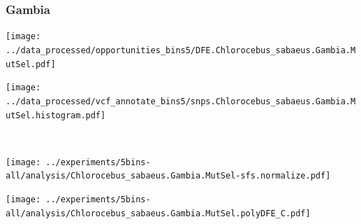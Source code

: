 \subsubsection{Gambia}

\begin{minipage}{0.49\linewidth}
    \texttt{[image: ../data\_processed/opportunities\_bins5/DFE.Chlorocebus\_sabaeus.Gambia.MutSel.pdf]}
\end{minipage}
\begin{minipage}{0.49\linewidth}
    \texttt{[image: ../data\_processed/vcf\_annotate\_bins5/snps.Chlorocebus\_sabaeus.Gambia.MutSel.histogram.pdf]}
\end{minipage}
\\
\begin{minipage}{0.49\linewidth}
    \texttt{[image: ../experiments/5bins-all/analysis/Chlorocebus\_sabaeus.Gambia.MutSel-sfs.normalize.pdf]}
\end{minipage}
\begin{minipage}{0.4\linewidth}
    \texttt{[image: ../experiments/5bins-all/analysis/Chlorocebus\_sabaeus.Gambia.MutSel.polyDFE\_C.pdf]}
\end{minipage}
